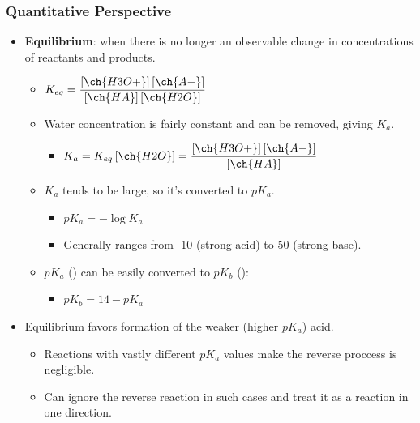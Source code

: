 \documentclass[12pt,a4paper]{article}
\begin{document}
\begin{itemize}
    \subsubsection{Quantitative Perspective}
    \begin{itemize}
        \item \textbf{Equilibrium}: when there is no longer an observable change in concentrations of reactants and products.
            \begin{itemize}
                \item \(K_{eq}=\dfrac{[\ch{H3O+}]\,[\ch{A-}]}{[\ch{HA}]\,[\ch{H2O}]}\)
                \item Water concentration is fairly constant and can be removed, giving \(K_a\).
                    \begin{itemize}
                        \item \(K_a=K_{eq}\,[\ch{H2O}]=\dfrac{[\ch{H3O+}]\,[\ch{A-}]}{[\ch{HA}]}\)
                    \end{itemize}
                \item \(K_a\) tends to be large, so it's converted to \(pK_a\).
                    \begin{itemize}
                        \item \(pK_a=-\log{K_a}\)
                        \item Generally ranges from {\color{pos}-10 (strong acid)} to {\color{neg}50 (strong base)}.
                    \end{itemize}
                \item {\color{pos}\(pK_a\) ()} can be easily converted to {\color{neg}\(pK_b\) ()}:
                    \begin{itemize}
                        \item \(pK_b=14-pK_a\)
                    \end{itemize}
            \end{itemize}
        \item Equilibrium {\color{o-Sun}favors formation} of the {\color{o-Sun} weaker} (higher \(pK_a\)) {\color{o-Sun}acid}.
            \begin{itemize}
                \item Reactions with vastly different \(pK_a\) values make the reverse proccess is negligible.
                \item Can ignore the reverse reaction in such cases and treat it as a reaction in one direction.
            \end{itemize}
    \end{itemize}

\end{itemize}
\end{document}
